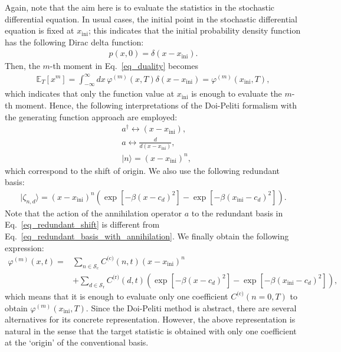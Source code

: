 \documentclass[sn-mathphys,Numbered]{sn-jnl}%
\theoremstyle{thmstyleone}%
\theoremstyle{thmstyletwo}%
\theoremstyle{thmstylethree}%
\begin{document}
Again, note that the aim here is to evaluate the statistics in the stochastic differential equation. In usual cases, the initial point in the stochastic differential equation is fixed at $x_\textrm{ini}$; this indicates that the initial probability density function has the following Dirac delta function:
\begin{align}
p(x,0) = \delta(x - x_\textrm{ini}).
\end{align}
Then, the $m$-th moment in Eq.~\eqref{eq_duality} becomes
\begin{align}
\mathbb{E}_T[x^m] = \int_{-\infty}^\infty dx \, \varphi^{(m)}(x,T) \delta(x - x_\textrm{ini}) = \varphi^{(m)}(x_\mathrm{ini},T),
\end{align}
which indicates that only the function value at $x_\mathrm{ini}$ is enough to evaluate the $m$-th moment. Hence, the following interpretations of the Doi-Peliti formalism with the generating function approach are employed:
\begin{align}
&a^\dagger \leftrightarrow (x-x_\mathrm{ini}), \label{eq_new_c}\\
&a \leftrightarrow \frac{d}{d(x-x_{\mathrm{ini}})}, \label{eq_new_a}\\
&| n \rangle = \left(x - x_{\mathrm{ini}}\right)^{n}, \label{eq_new_ket}
\end{align}
which correspond to the shift of origin. We also use the following redundant basis:
\begin{align}
| \zeta_{n,d} \rangle
= (x-x_\mathrm{ini})^n \left( \exp\left[ -\beta ( x - c_d )^2 \right] - \exp\left[ -\beta ( x_{\mathrm{ini}} - c_d )^2 \right] \right).
\label{eq_redundant_shift}
\end{align}
Note that the action of the annihilation operator $a$ to the redundant basis in Eq.~\eqref{eq_redundant_shift} is different from Eq.~\eqref{eq_redundant_basis_with_annihilation}. We finally obtain the following expression:
\begin{align}
\varphi^{(m)}(x,t)
= & \sum_{n \in \mathcal{S}_{\textrm{c}}} C^{\textrm{(c)}}(n,t) \left(x - x_{\mathrm{ini}}\right)^{n} \nonumber \\
&+ \sum_{d\in \mathcal{S}_{\textrm{r}}} C^{\textrm{(r)}}(d,t) \left( \exp\left[ -\beta ( x - c_d )^2 \right] - \exp\left[ -\beta ( x_{\mathrm{ini}} - c_d )^2 \right] \right),
\end{align}
which means that it is enough to evaluate only one coefficient $C^{\textrm{(c)}}(n=0,T)$ to obtain $\varphi^{(m)}(x_\mathrm{ini},T)$. Since the Doi-Peliti method is abstract, there are several alternatives for its concrete representation. However, the above representation is natural in the sense that the target statistic is obtained with only one coefficient at the `origin' of the conventional basis.
\end{document}
